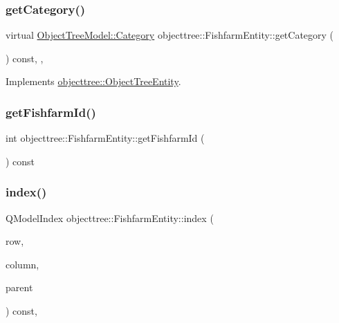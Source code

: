 \mbox{\label{classobjecttree_1_1_fishfarm_entity_a7bac8507c6e43f4647780efe6cbad68b}} 
\subsubsection{\texorpdfstring{getCategory()}{getCategory()}}
{\footnotesize\ttfamily virtual \mbox{\hyperlink{class_object_tree_model_a379e9d6b0d381853785adf62095ba4e3}{Object\+Tree\+Model\+::\+Category}} objecttree\+::\+Fishfarm\+Entity\+::get\+Category (\begin{DoxyParamCaption}{ }\end{DoxyParamCaption}) const\hspace{0.3cm}{\ttfamily [inline]}, {\ttfamily [override]}, {\ttfamily [virtual]}}



Implements \mbox{\hyperlink{classobjecttree_1_1_object_tree_entity_aa4e80e7fa80672c1b9902add665abc77}{objecttree\+::\+Object\+Tree\+Entity}}.

\mbox{\label{classobjecttree_1_1_fishfarm_entity_a4c087337758c6dec9c9f1363aa6897f0}} 
\subsubsection{\texorpdfstring{getFishfarmId()}{getFishfarmId()}}
{\footnotesize\ttfamily int objecttree\+::\+Fishfarm\+Entity\+::get\+Fishfarm\+Id (\begin{DoxyParamCaption}{ }\end{DoxyParamCaption}) const\hspace{0.3cm}{\ttfamily [inline]}}

\mbox{\label{classobjecttree_1_1_fishfarm_entity_a798031bca853586ff538fa667609fb83}} 
\subsubsection{\texorpdfstring{index()}{index()}}
{\footnotesize\ttfamily Q\+Model\+Index objecttree\+::\+Fishfarm\+Entity\+::index (\begin{DoxyParamCaption}\item[{int}]{row,  }\item[{int}]{column,  }\item[{const Q\+Model\+Index \&}]{parent }\end{DoxyParamCaption}) const\hspace{0.3cm}{\ttfamily [override]}, {\ttfamily [virtual]}}



